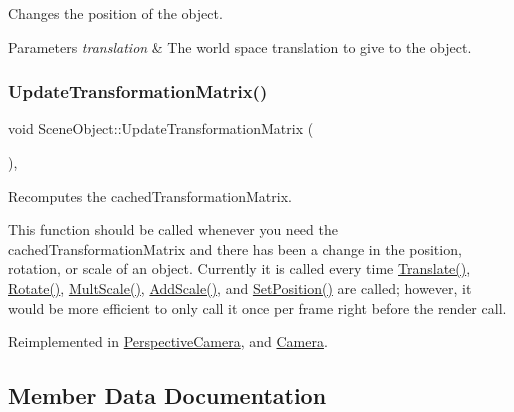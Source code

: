 Changes the position of the object.


\begin{DoxyParams}{Parameters}
{\em translation} & The world space translation to give to the object. \\
\hline
\end{DoxyParams}
\hypertarget{class_scene_object_a20e31da3f9d2765de50cdb2d637ae6c9}{}\label{class_scene_object_a20e31da3f9d2765de50cdb2d637ae6c9}
\subsubsection{\texorpdfstring{Update\+Transformation\+Matrix()}{UpdateTransformationMatrix()}}
{\footnotesize\ttfamily void Scene\+Object\+::\+Update\+Transformation\+Matrix (\begin{DoxyParamCaption}{ }\end{DoxyParamCaption})\hspace{0.3cm}{\ttfamily [protected]}, {\ttfamily [virtual]}}



Recomputes the cached\+Transformation\+Matrix.

This function should be called whenever you need the cached\+Transformation\+Matrix and there has been a change in the position, rotation, or scale of an object. Currently it is called every time \hyperlink{class_scene_object_a04868377580069b0ee9d202bdb1b7159}{Translate()}, \hyperlink{class_scene_object_a0d27f5853e8e1718b1a77f0f1a6d4551}{Rotate()}, \hyperlink{class_scene_object_a00d73ad3f7d77bfc0d3c1869decb97ea}{Mult\+Scale()}, \hyperlink{class_scene_object_a40d7194cf79cad6ee3a2fa7c3d8ed95c}{Add\+Scale()}, and \hyperlink{class_scene_object_a1903672e77e88a1e220fcfa8e6afc1d4}{Set\+Position()} are called; however, it would be more efficient to only call it once per frame right before the render call.

Reimplemented in \hyperlink{class_perspective_camera_a2f17fb07425e2146d5692805753fa368}{Perspective\+Camera}, and \hyperlink{class_camera_aea640c892a3807671d8ca49616d96eda}{Camera}.



\subsection{Member Data Documentation}
\hypertarget{class_scene_object_aac3f13eea8a7b455e8cffc6eceef211c}{}\label{class_scene_object_aac3f13eea8a7b455e8cffc6eceef211c}
